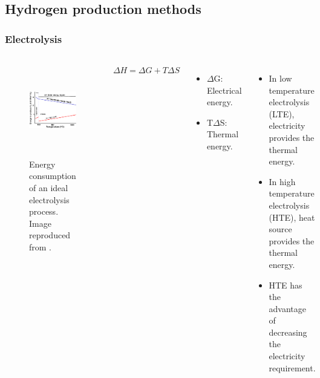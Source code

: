 \subsection{Hydrogen production methods}
\begin{frame}
\frametitle{Electrolysis}
\begin{columns}
    \column[t]{5cm}
	\begin{figure}[htbp!]
		\begin{center}
			\includegraphics[height=4.0cm]{images/ele-curve.png}
		\end{center}
		\caption{Energy consumption of an ideal electrolysis process. Image reproduced from \cite{hi2h2_highly_2007}.}
	\end{figure}

	\column[t]{5cm}
	$\Delta H = \Delta G + T \Delta S$
	\begin{itemize}
		\item $\Delta$G: Electrical energy.
		\item T$\Delta$S: Thermal energy.
	\end{itemize}
    \vspace{0.7cm}

	\begin{itemize}
    	\item In low temperature electrolysis (LTE), electricity provides the thermal energy.
    	\item In high temperature electrolysis (HTE), heat source provides the thermal energy.
    	\item HTE has the advantage of decreasing the electricity requirement.
    \end{itemize}
\end{columns}
\end{frame}


